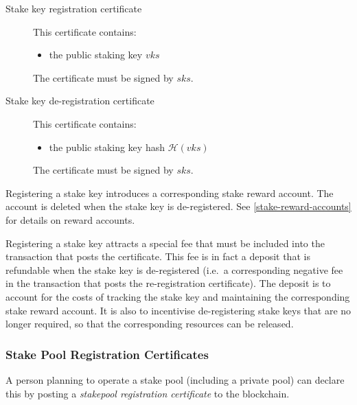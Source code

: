 \documentclass[11pt,a4paper]{article}
\begin{document}
\begin{description}
\item[Stake key registration certificate]
This certificate contains:

\begin{itemize}
\item
  the public staking key \(vks\)
\end{itemize}

The certificate must be signed by \(sks\).
\item[Stake key de-registration certificate]
This certificate contains:

\begin{itemize}
\item
  the public staking key hash \(\mathcal{H}(vks)\)
\end{itemize}

The certificate must be signed by \(sks\).
\end{description}

Registering a stake key introduces a corresponding stake reward account.
The account is deleted when the stake key is de-registered. See
\ref{stake-reward-accounts} for details on reward accounts.

Registering a stake key attracts a special fee that must be included
into the transaction that posts the certificate. This fee is in fact a
deposit that is refundable when the stake key is de-registered (i.e.~a
corresponding negative fee in the transaction that posts the
re-registration certificate). The deposit is to account for the costs of
tracking the stake key and maintaining the corresponding stake reward
account. It is also to incentivise de-registering stake keys that are no
longer required, so that the corresponding resources can be released.

\subsubsection{Stake Pool Registration
Certificates}\label{stake-pool-registration-certificates}

A person planning to operate a stake pool (including a private pool) can
declare this by posting a \emph{stakepool registration certificate} to
the blockchain.
\end{document}
